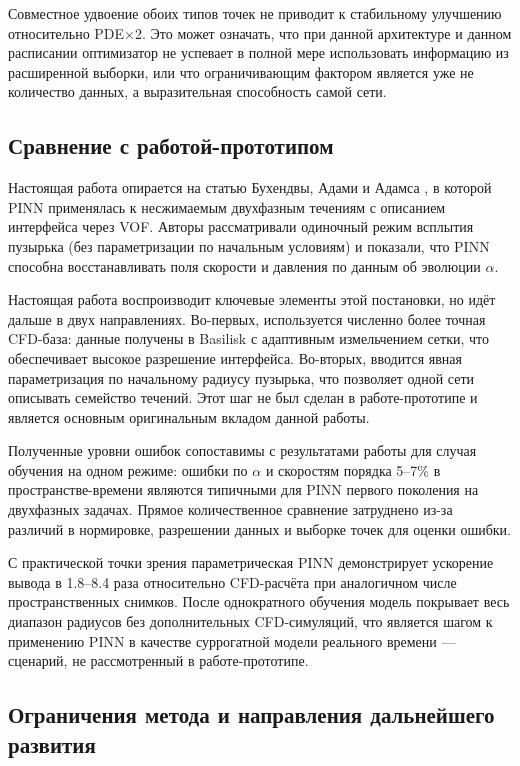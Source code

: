 \documentclass[12pt,a4paper]{article}
\begin{document}
Совместное удвоение обоих типов точек не приводит к стабильному улучшению
относительно PDE$\times$2. Это может означать, что при данной архитектуре и
данном расписании оптимизатор не успевает в полной мере использовать
информацию из расширенной выборки, или что ограничивающим фактором является
уже не количество данных, а выразительная способность самой сети.

\subsection{Сравнение с работой-прототипом}

Настоящая работа опирается на статью Бухендвы, Адами и Адамса
\cite{Buhendwa2021}, в которой PINN применялась к несжимаемым двухфазным
течениям с описанием интерфейса через VOF. Авторы рассматривали одиночный
режим всплытия пузырька (без параметризации по начальным условиям) и показали,
что PINN способна восстанавливать поля скорости и давления по данным об
эволюции \(\alpha\).

Настоящая работа воспроизводит ключевые элементы этой постановки, но идёт
дальше в двух направлениях. Во-первых, используется численно более точная
CFD-база: данные получены в Basilisk с адаптивным измельчением сетки, что
обеспечивает высокое разрешение интерфейса. Во-вторых, вводится явная
параметризация по начальному радиусу пузырька, что позволяет одной сети
описывать семейство течений. Этот шаг не был сделан в работе-прототипе и
является основным оригинальным вкладом данной работы.

Полученные уровни ошибок сопоставимы с результатами работы \cite{Buhendwa2021}
для случая обучения на одном режиме: ошибки по \(\alpha\) и скоростям порядка
5--7\% в пространстве-времени являются типичными для PINN первого поколения на
двухфазных задачах. Прямое количественное сравнение затруднено из-за различий
в нормировке, разрешении данных и выборке точек для оценки ошибки.

С практической точки зрения параметрическая PINN демонстрирует ускорение
вывода в 1.8--8.4 раза относительно CFD-расчёта при аналогичном числе
пространственных снимков. После однократного обучения модель покрывает весь
диапазон радиусов без дополнительных CFD-симуляций, что является шагом к
применению PINN в качестве суррогатной модели реального времени --- сценарий,
не рассмотренный в работе-прототипе.

\subsection{Ограничения метода и направления дальнейшего развития}
\end{document}
